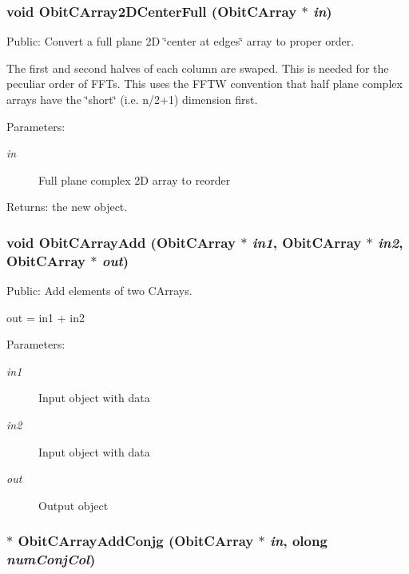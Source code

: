 \subsubsection{\setlength{\rightskip}{0pt plus 5cm}void Obit\-CArray2DCenter\-Full ({\bf Obit\-CArray} $\ast$ {\em in})}\label{ObitCArray_8c_a39}


Public: Convert a full plane 2D \char`\"{}center at edges\char`\"{} array to proper order. 

The first and second halves of each column are swaped. This is needed for the peculiar order of FFTs. This uses the FFTW convention that half plane complex arrays have the \char`\"{}short\char`\"{} (i.e. n/2+1) dimension first. \begin{Desc}
\item[Parameters:]
\begin{description}
\item[{\em in}]Full plane complex 2D array to reorder \end{description}
\end{Desc}
\begin{Desc}
\item[Returns:]the new object. \end{Desc}
\subsubsection{\setlength{\rightskip}{0pt plus 5cm}void Obit\-CArray\-Add ({\bf Obit\-CArray} $\ast$ {\em in1}, {\bf Obit\-CArray} $\ast$ {\em in2}, {\bf Obit\-CArray} $\ast$ {\em out})}\label{ObitCArray_8c_a22}


Public: Add elements of two CArrays. 

out = in1 + in2 \begin{Desc}
\item[Parameters:]
\begin{description}
\item[{\em in1}]Input object with data \item[{\em in2}]Input object with data \item[{\em out}]Output object \end{description}
\end{Desc}
\subsubsection{$\ast$ Obit\-CArray\-Add\-Conjg ({\bf Obit\-CArray} $\ast$ {\em in}, {\bf olong} {\em num\-Conj\-Col})}\label{ObitCArray_8c_a40}


